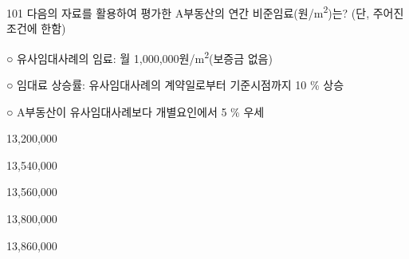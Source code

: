 \begin{question}{101}
다음의 자료를 활용하여 평가한 A부동산의 연간 비준임료(원/m\textsuperscript{2})는? (단, 주어진 조건에 한함)
\begin{framedtext}
○ 유사임대사례의 임료: 월 1,000,000원/m\textsuperscript{2}(보증금 없음) \par
○ 임대료 상승률: 유사임대사례의 계약일로부터 기준시점까지 10 \% 상승 \par
○ A부동산이 유사임대사례보다 개별요인에서 5 \% 우세
\end{framedtext}
\begin{choices}
  \item 13,200,000
  \item 13,540,000
  \item 13,560,000
  \item 13,800,000
  \item 13,860,000
\end{choices}
\end{question}
